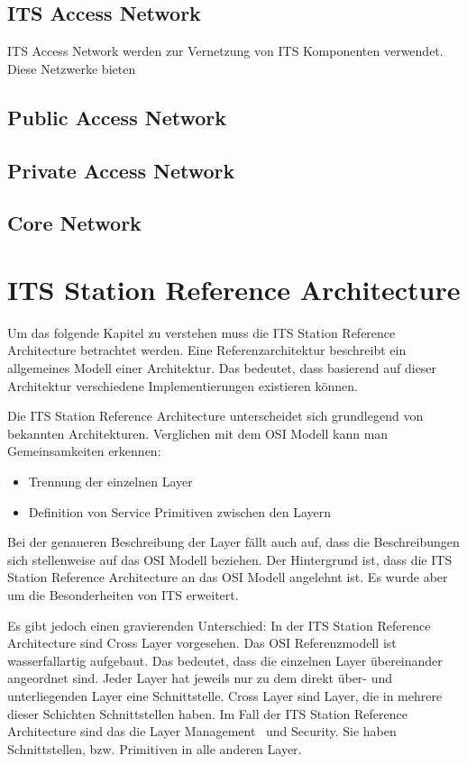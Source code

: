 \subsection{ITS Access Network}
ITS Access Network werden zur Vernetzung von \ac{ITS} Komponenten verwendet. Diese Netzwerke bieten 

\subsection{Public Access Network}
\subsection{Private Access Network}
\subsection{Core Network}




\section{ITS Station Reference Architecture}
Um das folgende Kapitel zu verstehen muss die \ac{ITS} Station Reference Architecture betrachtet werden. Eine Referenzarchitektur beschreibt ein allgemeines Modell einer Architektur. Das bedeutet, dass basierend auf dieser Architektur verschiedene Implementierungen existieren können. 

Die \ac{ITS} Station Reference Architecture unterscheidet sich grundlegend von bekannten Architekturen. Verglichen mit dem \ac{OSI} Modell kann man Gemeinsamkeiten erkennen:
\begin{itemize}
	\item Trennung der einzelnen Layer
	\item Definition von Service Primitiven zwischen den Layern
\end{itemize}

Bei der genaueren Beschreibung der Layer fällt auch auf, dass die Beschreibungen sich stellenweise auf das \ac{OSI} Modell beziehen. Der Hintergrund ist, dass die \ac{ITS} Station Reference Architecture an das \ac{OSI} Modell angelehnt ist. Es wurde aber um die Besonderheiten von \ac{ITS} erweitert.

Es gibt jedoch einen gravierenden Unterschied: In der \ac{ITS} Station Reference Architecture sind Cross Layer vorgesehen. Das \ac{OSI} Referenzmodell ist wasserfallartig aufgebaut. Das bedeutet, dass die einzelnen Layer übereinander angeordnet sind. Jeder Layer hat jeweils nur zu dem direkt über- und unterliegenden Layer eine Schnittstelle. Cross Layer sind Layer, die in mehrere dieser Schichten Schnittstellen haben. Im Fall der \ac{ITS} Station Reference Architecture sind das die Layer \glqq Management\grqq~ und \glqq Security\grqq. Sie haben Schnittstellen, bzw. Primitiven in alle anderen Layer. 

